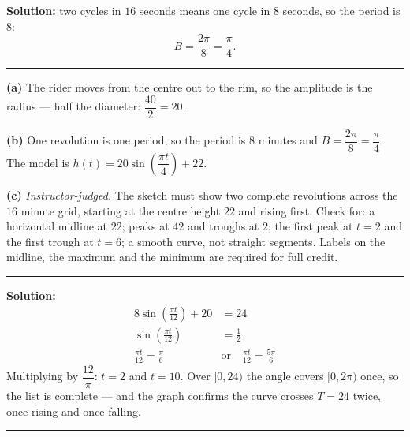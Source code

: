\documentclass[12pt]{article}
\begin{document}
\textbf{Solution:} two cycles in $16$ seconds means one cycle in $8$ seconds, so the period is $8$:
\[ B = \frac{2\pi}{8} = \frac{\pi}{4}. \]

\vspace{0.1cm}\noindent\rule{\linewidth}{0.2pt}\vspace{0.1cm}


\textbf{(a)} The rider moves from the centre out to the rim, so the amplitude is the radius --- half the diameter: $\dfrac{40}{2} = 20$. 

\textbf{(b)} One revolution is one period, so the period is $8$ minutes and $B = \dfrac{2\pi}{8} = \dfrac{\pi}{4}$. The model is $h(t) = 20\sin\!\left(\dfrac{\pi t}{4}\right) + 22$. 

\textbf{(c)} \emph{Instructor-judged.} The sketch must show two complete revolutions across the $16$ minute grid, starting at the centre height $22$ and rising first. Check for: a horizontal midline at $22$; peaks at $42$ and troughs at $2$; the first peak at $t = 2$ and the first trough at $t = 6$; a smooth curve, not straight segments. Labels on the midline, the maximum and the minimum are required for full credit.

\vspace{0.1cm}\noindent\rule{\linewidth}{0.2pt}\vspace{0.1cm}


\textbf{Solution:}
\begin{align*}
  8\sin\!\left(\frac{\pi t}{12}\right) + 20 &= 24 \\
  \sin\!\left(\frac{\pi t}{12}\right) &= \frac{1}{2} \\
  \frac{\pi t}{12} = \frac{\pi}{6} \quad&\text{or}\quad \frac{\pi t}{12} = \frac{5\pi}{6}
\end{align*}
Multiplying by $\dfrac{12}{\pi}$: $t = 2$ and $t = 10$. Over $[0, 24)$ the angle covers $[0, 2\pi)$ once, so the list is complete --- and the graph confirms the curve crosses $T = 24$ twice, once rising and once falling. 

\vspace{0.1cm}\noindent\rule{\linewidth}{0.2pt}\vspace{0.1cm}
\end{document}
